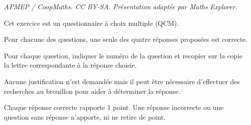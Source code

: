 \documentclass[10pt]{article}
\begin{document}
\noindent\textit{APMEP / CoopMaths. CC BY-SA. Présentation adaptée par Maths Explorer.}\par\medskip
\medskip

Cet exercice est un questionnaire à choix multiple (QCM).

Pour chacune des questions, une seule des  quatre réponses proposées est correcte. 

Pour chaque question, indiquer le numéro de la question et recopier sur la copie la lettre correspondante à la réponse choisie.

Aucune justification n'est demandée mais il peut être nécessaire d'effectuer des recherches au
brouillon pour aider à déterminer la réponse.

Chaque réponse correcte rapporte 1 point. Une réponse incorrecte ou une question sans réponse
n'apporte, ni ne retire de point.

\medskip
\end{document}
